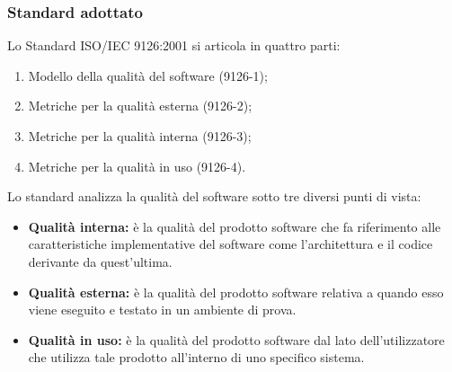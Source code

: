	\subsubsection{Standard adottato}
	Lo Standard ISO/IEC 9126:2001 si articola in quattro parti:
		\begin{enumerate}
		\item Modello della qualità del software (9126-1);
			\item Metriche per la qualità esterna (9126-2);
			\item Metriche per la qualità interna (9126-3);
			\item Metriche per la qualità in uso (9126-4).
		\end{enumerate}
		Lo standard analizza la qualità del software sotto tre diversi punti di vista:
		\begin{itemize}
			\item \textbf{Qualità interna:} è la qualità del prodotto software che fa riferimento alle caratteristiche implementative del software come l'architettura e il codice derivante da quest'ultima.
			\item \textbf{Qualità esterna:} è la qualità del prodotto software relativa a quando esso viene eseguito e testato in un ambiente di prova. 
			\item \textbf{Qualità in uso:} è la qualità del prodotto software dal lato dell'utilizzatore che utilizza tale prodotto all'interno di uno specifico sistema.
		\end{itemize}
